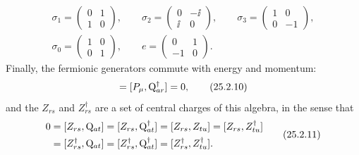 \begin{equation}
\begin{gathered}
\sigma_1=
\begin{pmatrix}0&1\\1&0\end{pmatrix},
\qquad
\sigma_2=
\begin{pmatrix}0&-\ii\\\ii&0\end{pmatrix},
\qquad
\sigma_3=
\begin{pmatrix}1&0\\0&-1\end{pmatrix},
\\
\sigma_0=
\begin{pmatrix}1&0\\0&1\end{pmatrix},
\qquad
e=
\begin{pmatrix}0&1\\-1&0\end{pmatrix}.
\end{gathered}
\tag{25.2.9}\label{eq:25.2.9}
\end{equation}
Finally, the fermionic generators commute with energy and momentum:
\begin{equation}
[P_\mu,\WeylQ_{ar}]=[P_\mu,\WeylQ_{ar}^\dagger]=0,
\tag{25.2.10}\label{eq:25.2.10}
\end{equation}
and the \(Z_{rs}\) and \(Z_{rs}^\dagger\) are a set of central charges of this
algebra, in the sense that
\begin{equation}
\begin{aligned}
0
&=[Z_{rs},\mathrm{Q}_{at}]
=[Z_{rs},\mathrm{Q}_{at}^\dagger]
=[Z_{rs},Z_{tu}]
=[Z_{rs},Z_{tu}^\dagger]
\\
&=[Z_{rs}^\dagger,\mathrm{Q}_{at}]
=[Z_{rs}^\dagger,\mathrm{Q}_{at}^\dagger]
=[Z_{rs}^\dagger,Z_{tu}^\dagger].
\end{aligned}
\tag{25.2.11}\label{eq:25.2.11}
\end{equation}

